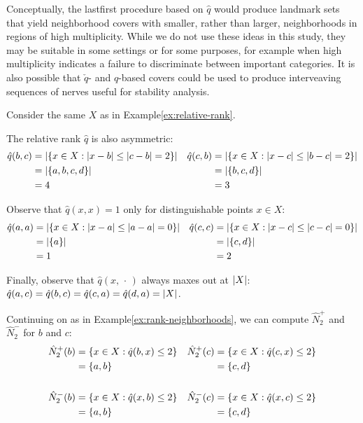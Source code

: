 \documentclass{article}
\begin{document}
Conceptually, the lastfirst procedure based on \(\hat{q}\) would produce
landmark sets that yield neighborhood covers with smaller, rather than
larger, neighborhoods in regions of high multiplicity. While we do not
use these ideas in this study, they may be suitable in some settings or
for some purposes, for example when high multiplicity indicates a
failure to discriminate between important categories. It is also
possible that \(\check{q}\)- and \(\hat{q}\)-based covers could be used
to produce interveaving sequences of nerves useful for stability
analysis.

\begin{example}\label{ex:relative-rank-max}
Consider the same $X$ as in Example\nbs\ref{ex:relative-rank}.

The relative rank $\hat{q}$ is also asymmetric:
\begin{align*}
    \hat{q}(b,c) &= \lvert \{x \in X : \lvert x-b\rvert \leq \lvert c-b\rvert = 2\}\rvert &
    \hat{q}(c,b) &= \lvert \{x \in X : \lvert x-c\rvert \leq \lvert b-c\rvert = 2\}\rvert \\
        &= \lvert \{a, b, c, d\}\rvert &&= \lvert \{b, c, d\}\rvert \\
        &= 4 &&= 3
\end{align*}

Observe that $\hat{q}(x,x) = 1$ only for distinguishable points $x \in X$:
\begin{align*}
    \hat{q}(a,a) &= \lvert \{x \in X : \lvert x-a\rvert \leq \lvert a-a\rvert = 0\}\rvert &
    \hat{q}(c,c) &= \lvert \{x \in X : \lvert x-c\rvert \leq \lvert c-c\rvert = 0\}\rvert \\
       &= \lvert \{a\}\rvert &&= \lvert \{c, d\}\rvert \\
       &= 1 &&= 2
\end{align*}

Finally, observe that $\hat{q}(x,\,\cdot\,)$ always maxes out at $\lvert X\rvert$: $\hat{q}(a,c) = \hat{q}(b,c) = \hat{q}(c,a) = \hat{q}(d,a) = \lvert X\rvert$.

Continuing on as in Example\nbs\ref{ex:rank-neighborhoods}, we can compute $\hat{N}_2^+$ and $\hat{N}_2^-$ for $b$ and $c$:
\begin{align*}
    \hat{N}_2^+ (b) &= \{x \in X : \hat{q}(b,x) \leq 2\} &
    \hat{N}_2^+ (c) &= \{x \in X : \hat{q}(c,x) \leq 2\} \\
        &= \{a, b\} &&= \{c, d\} \\
        \\
    \hat{N}_2^- (b) &= \{x \in X : \hat{q}(x,b) \leq 2\} &
    \hat{N}_2^- (c) &= \{x \in X : \hat{q}(x,c) \leq 2\} \\
        &= \{a, b\} &&= \{c, d\}
\end{align*}


\end{example}
\end{document}
